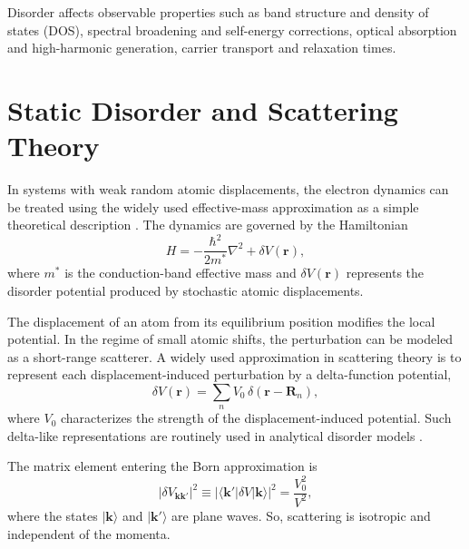 Disorder affects observable properties such as band structure and density of states (DOS), spectral broadening and self-energy corrections, optical absorption and high-harmonic generation, carrier transport and relaxation times.




\section{Static Disorder and Scattering Theory}
\label{sec:RandomSi}




In systems with weak random atomic displacements, the electron dynamics can be treated using the widely used effective-mass approximation as a simple theoretical description \cite{PhysRev.97.869}. The dynamics are governed by the Hamiltonian
\begin{equation}
H = -\frac{\hbar^2}{2 m^\ast} \nabla^2 + \delta V(\mathbf{r}),
\end{equation}
where $m^\ast$ is the conduction-band effective mass and $\delta V(\mathbf{r})$ represents the disorder potential produced by stochastic atomic displacements.


The displacement of an atom from its equilibrium position modifies the local potential. In the regime of small atomic shifts, the perturbation can be modeled as a short-range scatterer. A widely used approximation in scattering theory \cite{Mahan2000,Economou2006} is to represent each displacement-induced perturbation by a delta-function potential,
\begin{equation}
\delta V(\mathbf{r}) = \sum_{n} V_0 \, \delta(\mathbf{r} - \mathbf{R}_n),
\end{equation}
where $V_0$ characterizes the strength of the displacement-induced potential.  
Such delta-like representations are routinely used in analytical disorder models \cite{Schirmacher2009}.

The matrix element entering the Born approximation is \cite{Mahan2000}
\begin{equation}
|\delta V_{\mathbf{k}\mathbf{k}'}|^2 \equiv |\langle \mathbf{k}' | \delta V | \mathbf{k} \rangle|^2 = \frac{V_0^2}{V^2},
\label{eq:delta_V}
\end{equation}
where the states $|\mathbf k\rangle$ and $|\mathbf k'\rangle$ are plane waves. So, scattering is isotropic and independent of the momenta.

